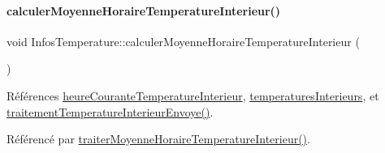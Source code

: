 \mbox{\label{class_infos_temperature_a8cb8b9bef07506019ea6c9d91809af87}} 
\paragraph{\texorpdfstring{calculer\+Moyenne\+Horaire\+Temperature\+Interieur()}{calculerMoyenneHoraireTemperatureInterieur()}}
{\footnotesize\ttfamily void Infos\+Temperature\+::calculer\+Moyenne\+Horaire\+Temperature\+Interieur (\begin{DoxyParamCaption}{ }\end{DoxyParamCaption})\hspace{0.3cm}{\ttfamily [private]}}



Références \hyperlink{class_infos_temperature_a708b70383d309fa0ba355dcc3921cc23}{heure\+Courante\+Temperature\+Interieur}, \hyperlink{class_infos_temperature_a39a976c10811a7589e4aba42586813c5}{temperatures\+Interieurs}, et \hyperlink{class_infos_temperature_a2d7c580a215f918a79aac46a15ff24b9}{traitement\+Temperature\+Interieur\+Envoye()}.



Référencé par \hyperlink{class_infos_temperature_a0311c8ce5730388f3baef752920d5abf}{traiter\+Moyenne\+Horaire\+Temperature\+Interieur()}.


